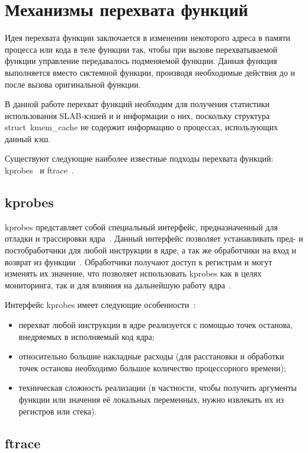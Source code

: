 \section{Механизмы перехвата функций}

Идея перехвата функции заключается в изменении некоторого адреса в памяти процесса или кода в теле функции так, чтобы при вызове перехватываемой функции управление передавалось подменяемой функции.
Данная функция выполняется вместо системной функции, производя необходимые действия до и после вызова оригинальной функции.

В данной работе перехват функций необходим для получения статистики использования SLAB-кэшей и и информации о них, поскольку структура struct~kmem\_cache не содержит информацию о процессах, использующих данный кэш.

Существуют следующие наиболее известные подходы перехвата функций: kprobes~\cite{kprobes} и ftrace~\cite{ftrace}.

\subsection{kprobes}

kprobes представляет собой специальный интерфейс, предназначенный для отладки и трассировки ядра~\cite{kprobes}.
Данный интерфейс позволяет устанавливать пред- и постобработчики для любой инструкции в ядре, а так же обработчики на вход и возврат из функции~\cite{kprobes}.
Обработчики получают доступ к регистрам и могут изменять их значение, что позволяет использовать kprobes как в целях мониторинга, так и для влияния на дальнейшую работу ядра~\cite{kprobes}.

Интерфейс kprobes имеет следующие особенности~\cite{kprobes}:
\begin{itemize}
	\item перехват любой инструкции в ядре реализуется с помощью точек останова, внедряемых в исполняемый код ядра;
	\item относительно большие накладные расходы (для расстановки и обработки точек останова необходимо большое количество процессорного времени);
	\item техническая сложность реализации (в частности, чтобы получить аргументы функции или значения её локальных переменных, нужно извлекать их из регистров или стека).
\end{itemize}

\subsection{ftrace}

